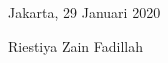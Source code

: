\lipsum[1-3]

	\vskip 3cm
	\hspace{10cm} Jakarta, 29 Januari 2020 \par
	\vskip 3cm
	\hspace{10cm} Riestiya Zain Fadillah